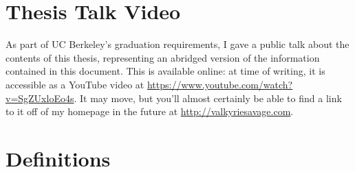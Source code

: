 \chapter{Thesis Talk Video}

As part of UC Berkeley's graduation requirements, I gave a public talk about the contents of this thesis, representing an abridged version of the information contained in this document. This is available online: at time of writing, it is accessible as a YouTube video at \url{https://www.youtube.com/watch?v=SgZUxloEo4s}. It may move, but you'll almost certainly be able to find a link to it off of my homepage in the future at \url{http://valkyriesavage.com}.

\chapter{Definitions}

